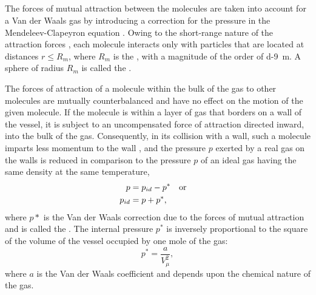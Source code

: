 \subsection{}\label{12.2.3} The forces of mutual attraction between the molecules are taken into account for a Van der Waals gas by introducing a correction for the pressure in the Mendeleev-Clapeyron equa­tion . Owing to the short-range nature of the attraction forces , each molecule interacts only with particles that are located at distances $r \leqslant R_{m}$, where $R_{m}$ is the , with a magnitude of the order of \SI{d-9}{\meter}. A sphere of radius $R_{m}$ is called the .

The forces of attraction of a molecule within the bulk of the gas to other molecules are mutually counterbalanced and have no effect on the motion of the given molecule. If the molecule is within a layer of gas that borders on a wall of the vessel, it is subject to an uncompensated force of attraction directed inward, into the bulk of the gas. Consequently, in its collision with a wall, such a molecule imparts less momentum to the wall , and the pressure $p$ exerted by a real gas on the walls is reduced in comparison to the pressure $p$ of an ideal gas having the same density at the same temperature,
\begin{align*}%
p & = p_{id} - p^{*} \qor\\
p_{id} & = p + p^{*},
\end{align*}
where $p*$ is the Van der Waals correction due to the forces of mutual attraction and is called the . The inter­nal pressure $p^{*}$ is inversely proportional to the square of the volume of the vessel occupied by one mole of the gas:
\begin{equation*}%
p^{*} = \frac{a}{V_{\mu}^{2}},
\end{equation*}
where $a$ is the Van der Waals coefficient and depends upon the chemical nature of the gas.

